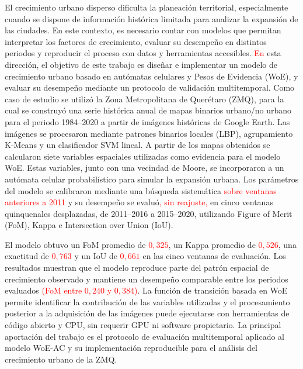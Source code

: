 {\color{blue}
El crecimiento urbano disperso dificulta la planeación territorial, especialmente cuando se dispone de información histórica limitada para analizar la expansión de las ciudades. En este contexto, es necesario contar con modelos que permitan interpretar los factores de crecimiento, evaluar su desempeño en distintos periodos y reproducir el proceso con datos y herramientas accesibles. \textcolor{red}{En} esta dirección, el objetivo de este trabajo es diseñar e implementar un modelo de crecimiento urbano basado en autómatas celulares y Pesos de Evidencia (WoE), y evaluar su desempeño mediante un protocolo de validación multitemporal. Como caso de estudio se utilizó la Zona Metropolitana de Querétaro (ZMQ), para la cual se construyó una serie histórica anual de mapas binarios urbano/no urbano para el periodo 1984--2020 a partir de imágenes históricas de Google Earth. Las imágenes se procesaron mediante patrones binarios locales (LBP), agrupamiento K-Means y un clasificador SVM lineal. A partir de los mapas obtenidos se calcularon siete variables espaciales utilizadas como evidencia para el modelo WoE. Estas variables, junto con una vecindad de Moore, se incorporaron a un autómata celular probabilístico para simular la expansión urbana. Los parámetros del modelo se calibraron mediante una búsqueda sistemática \textcolor{red}{sobre ventanas anteriores a 2011} y su desempeño se evaluó\textcolor{red}{, sin reajuste,} en cinco ventanas quinquenales desplazadas, de 2011--2016 a 2015--2020, utilizando Figure of Merit (FoM), Kappa e Intersection over Union (IoU).

El modelo obtuvo un FoM promedio de \textcolor{red}{$0{,}325$}, un Kappa promedio de \textcolor{red}{$0{,}526$}, una exactitud de \textcolor{red}{$0{,}763$} y un IoU de \textcolor{red}{$0{,}661$} en las cinco ventanas de evaluación. Los resultados muestran que el modelo reproduce parte del patrón espacial de crecimiento observado y mantiene un desempeño comparable entre los periodos evaluados \textcolor{red}{(FoM entre $0{,}240$ y $0{,}384$)}. La función de transición basada en WoE permite identificar la contribución de las variables utilizadas y el procesamiento posterior a la adquisición de las imágenes puede ejecutarse con herramientas de código abierto y CPU, sin requerir GPU ni software propietario. La principal aportación del trabajo es el protocolo de evaluación multitemporal aplicado al modelo WoE-AC y su implementación reproducible para el análisis del crecimiento urbano de la ZMQ.
}

